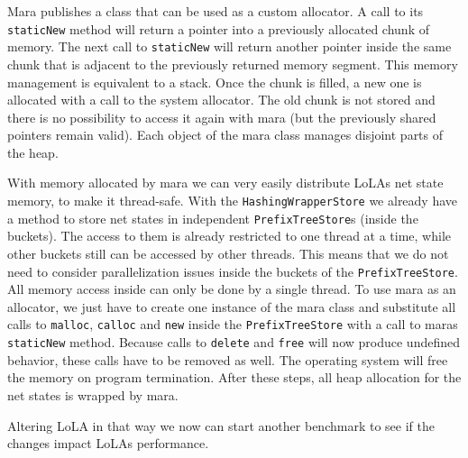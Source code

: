 Mara publishes a class that can be used as a custom allocator. A call to its \texttt{staticNew} method will return a pointer into a previously allocated chunk of memory. The next call to \texttt{staticNew} will return another pointer inside the same chunk that is adjacent to the previously returned memory segment. This memory management is equivalent to a stack. Once the chunk is filled, a new one is allocated with a call to the system allocator. The old chunk is not stored and there is no possibility to access it again with mara (but the previously shared pointers remain valid). Each object of the mara class manages disjoint parts of the heap.

With memory allocated by mara we can very easily distribute LoLAs net state memory, to make it thread-safe. With the \texttt{Hashing\-Wrapper\-Store} we already have a method to store net states in independent \texttt{PrefixTreeStore}s (inside the buckets). The access to them is already restricted to one thread at a time, while other buckets still can be accessed by other threads. This means that we do not need to consider parallelization issues inside the buckets of the \texttt{PrefixTreeStore}. All memory access inside can only be done by a single thread. To use mara as an allocator, we just have to create one instance of the mara class and substitute all calls to \texttt{malloc}, \texttt{calloc} and \texttt{new} inside the \texttt{PrefixTreeStore} with a call to maras \texttt{staticNew} method. Because calls to \texttt{delete} and \texttt{free} will now produce undefined behavior, these calls have to be removed as well. The operating system will free the memory on program termination. After these steps, all heap allocation for the net states is wrapped by mara. 

Altering LoLA in that way we now can start another benchmark to see if the changes impact LoLAs performance. 


